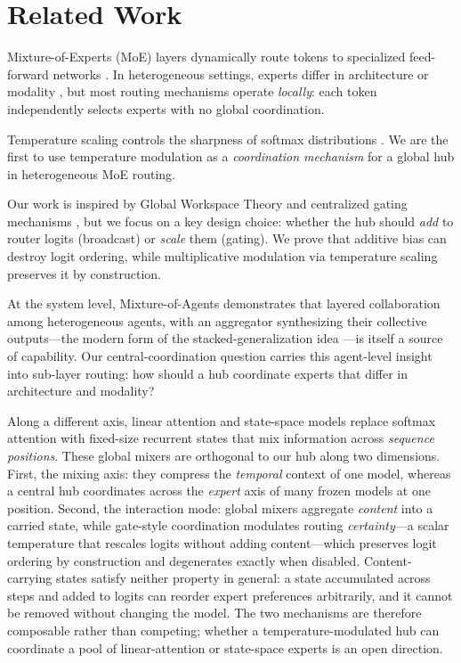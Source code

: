 \documentclass[10pt,twoside]{article}
\theoremstyle{definition}
\begin{document}
\section{Related Work}

Mixture-of-Experts (MoE) layers dynamically route tokens to specialized feed-forward networks \citep{shazeerOutrageouslyLargeNeural2017}. In heterogeneous settings, experts differ in architecture or modality \citep{vaswani2017}, but most routing mechanisms operate \textit{locally}: each token independently selects experts with no global coordination.

Temperature scaling controls the sharpness of softmax distributions \citep{hintonDistillingKnowledgeNeural2015}. We are the first to use temperature modulation as a \textit{coordination mechanism} for a global hub in heterogeneous MoE routing.

Our work is inspired by Global Workspace Theory \citep{baarsCognitiveTheoryConsciousness1988} and centralized gating mechanisms \citep{wangLinformerSelfAttentionLinear2020}, but we focus on a key design choice: whether the hub should \textit{add} to router logits (broadcast) or \textit{scale} them (gating). We prove that additive bias can destroy logit ordering, while multiplicative modulation via temperature scaling preserves it by construction.

At the system level, Mixture-of-Agents \citep{wang2024moa} demonstrates that layered collaboration among heterogeneous agents, with an aggregator synthesizing their collective outputs---the modern form of the stacked-generalization idea \citep{wolpertStackedGeneralization1992}---is itself a source of capability. Our central-coordination question carries this agent-level insight into sub-layer routing: how should a hub coordinate experts that differ in architecture and modality?

Along a different axis, linear attention \citep{katharopoulos2020} and state-space models \citep{gu2022s4,gu2023mamba} replace softmax attention with fixed-size recurrent states that mix information across \textit{sequence positions}. These global mixers are orthogonal to our hub along two dimensions. First, the mixing axis: they compress the \textit{temporal} context of one model, whereas a central hub coordinates across the \textit{expert} axis of many frozen models at one position. Second, the interaction mode: global mixers aggregate \textit{content} into a carried state, while gate-style coordination modulates routing \textit{certainty}---a scalar temperature that rescales logits without adding content---which preserves logit ordering by construction and degenerates exactly when disabled. Content-carrying states satisfy neither property in general: a state accumulated across steps and added to logits can reorder expert preferences arbitrarily, and it cannot be removed without changing the model. The two mechanisms are therefore composable rather than competing; whether a temperature-modulated hub can coordinate a pool of linear-attention or state-space experts is an open direction.
\end{document}

